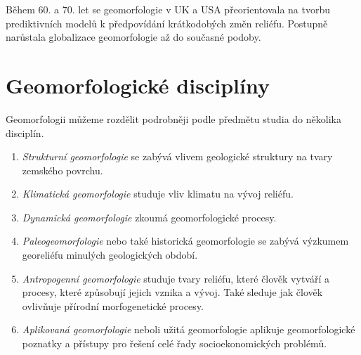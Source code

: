 Během 60. a 70. let se geomorfologie v UK a USA přeorientovala na tvorbu prediktivních modelů k předpovídání krátkodobých změn reliéfu. Postupně narůstala globalizace geomorfologie až do současné podoby.

\section{Geomorfologické disciplíny}
Geomorfologii můžeme rozdělit podrobněji podle předmětu studia do několika disciplín.
\begin{enumerate}
	\item \emph{Strukturní geomorfologie} se zabývá vlivem geologické struktury na tvary zemského povrchu.
	\item \emph{Klimatická geomorfologie} studuje vliv klimatu na vývoj reliéfu.
	\item \emph{Dynamická geomorfologie} zkoumá geomorfologické procesy.
	\item \emph{Paleogeomorfologie} nebo také historická geomorfologie se zabývá výzkumem georeliéfu minulých geologických období.
	\item \emph{Antropogenní geomorfologie} studuje tvary reliéfu, které člověk vytváří a procesy, které způsobují jejich vznika a vývoj. Také sleduje jak člověk ovlivňuje přírodní morfogenetické procesy.
	\item \emph{Aplikovaná geomorfologie} neboli užitá geomorfologie aplikuje geomorfologické poznatky a přístupy pro řešení celé řady socioekonomických problémů.
\end{enumerate}
